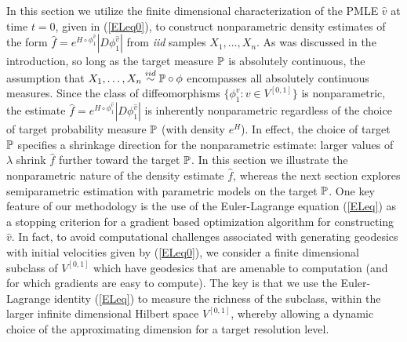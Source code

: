 \documentclass[noinfoline]{imsart}
\begin{document}
In this section we utilize the finite dimensional characterization of the PMLE $\hat v$ at time $t=0$, given in (\ref{ELeq0}), to construct nonparametric density estimates of the form $\hat f= e^{ H\circ \phi^{\hat v}_1}  |D\phi_1^{\hat v}| $ from {\em iid} samples $X_1,\ldots, X_n$.
As was discussed in the introduction, so long as the target measure $\Bbb P$ is absolutely continuous, the assumption that   $X_1,\ldots, X_n \overset{iid}\sim \Bbb  P\circ \phi$ encompasses all absolutely continuous measures. Since the class of diffeomorphisms $\{\phi_1^v\colon v\in V^{[0,1]}\}$ is nonparametric, the estimate $\hat f= e^{ H\circ \phi^{\hat v}_1}  |D\phi_1^{\hat v}| $ is inherently nonparametric regardless of the choice of target probability measure $\Bbb P$ (with density $e^H$). In effect, the choice of target $\Bbb P$ specifies a shrinkage direction for the nonparametric estimate: larger values of $\lambda$ shrink $\hat f$ further toward the target $\Bbb P$.
In this section we illustrate the nonparametric nature of the density estimate $\hat f$, whereas the next section explores semiparametric estimation with parametric models on the target $\Bbb P$.     One  key feature of our methodology is the use of the Euler-Lagrange equation (\ref{ELeq}) as a stopping criterion for a gradient based optimization algorithm for constructing $\hat v$. In fact, to avoid computational challenges associated with generating geodesics  with initial velocities given by (\ref{ELeq0}), we consider a finite dimensional subclass of $V^{[0,1]}$ which have geodesics that are amenable to computation (and for which gradients are easy to compute). The key is that we use the Euler-Lagrange identity (\ref{ELeq}) to measure the richness of the subclass, within the larger infinite dimensional Hilbert space $V^{[0,1]}$, whereby allowing a dynamic choice  of the approximating dimension for a target resolution level.  
\end{document}
